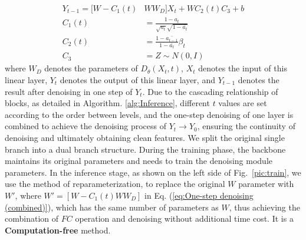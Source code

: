 \documentclass[conference]{IEEEtran}
\begin{document}
{\begin{equation}
\begin{aligned}
     Y_{t-1} = [W - C_1(t) &WW_D]X_t+WC_2(t)C_3 + b  \\
     C_1(t)  &= \frac{1-a_t}{\sqrt{a_t}\sqrt{1-\bar{a_t} }  }\\
     C_2(t) &= \frac{1-\bar{a_{t-1}}}{1-\bar{a_t}} \beta_t\\
     C_3  &= Z\sim N(0, I)
\end{aligned}
\label{eq:One-step denoising (combined)} 
\end{equation}
where $W_D$ denotes the parameters of $D_\theta(X_t, t)$, $X_t$ denotes the input of this linear layer, $Y_t$ denotes the output of this linear layer, and $Y_{t-1}$ denotes the result after denoising in one step of $Y_t$. Due to the cascading relationship of blocks, as detailed in Algorithm. \ref{alg:Inference}, different $t$ values are set according to the order between levels, and the one-step denoising of one layer is combined to achieve the denoising process of $Y_t \rightarrow Y_0$, ensuring the continuity of denoising and ultimately obtaining clean features. We split the original single branch into a dual branch structure. During the training phase, the backbone maintains its original parameters and needs to train the denoising module parameters. In the inference stage, as shown on the left side of Fig.~\ref{pic:train}, we use the method of reparameterization, to replace the original $W$ parameter with $W'$, where $W' = [W - C_1(t) WW_D]$ in Eq. (\ref{eq:One-step denoising (combined)}), which has the same number of parameters as $W$, thus achieving the combination of $FC$ operation and denoising without additional time cost. It is a \textbf{Computation-free} method.


}
\end{document}
